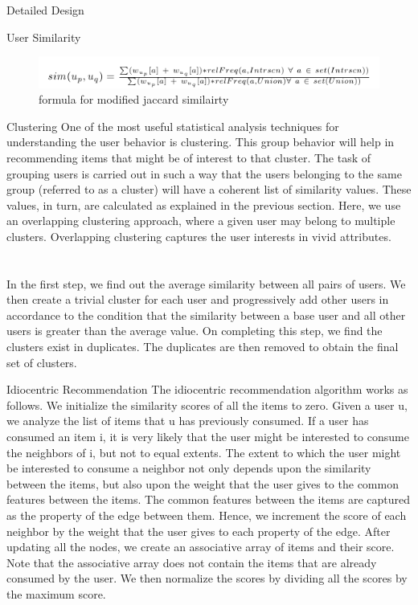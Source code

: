 \documentclass{report}
\begin{document}
\begin{projChapter}{Detailed Design}
\begin{projSection}{User Similarity}
\begin{figure}[ht!]
\centering
\includegraphics[scale=0.6]{images/similarity.png}
\caption{formula for modified jaccard similairty}
\label{similarity}
\end{figure}

\end{projSection}
\begin{projSection}{Clustering}
            One of the most useful statistical analysis techniques for understanding the user behavior is clustering. This group behavior will help in recommending items that might be of interest to that cluster. The task of grouping users is carried out in such a way that the users belonging to the same group (referred to as a cluster) will have a coherent list of similarity values. These values, in turn, are calculated as explained in the previous section. Here, we use an overlapping clustering approach, where a given user may belong to multiple clusters. Overlapping clustering captures the user interests in vivid attributes.
            ~\\\\
            ~\\
            In the first step, we find out the average similarity between all pairs of users. We then create a trivial cluster for each user and progressively add other users in accordance to the condition that the similarity between a base user and all other users is greater than the average value. On completing this step, we find the clusters exist in duplicates. The duplicates are then removed to obtain the final set of clusters.
        \end{projSection}
\begin{projSection}{Idiocentric Recommendation}
            The idiocentric recommendation algorithm works as follows. We initialize the similarity scores of all the items to zero. Given a user u, we analyze the list of items that u has previously consumed. If a user has consumed an item i, it is very likely that the user might be interested to consume the neighbors of i, but not to equal extents. The extent to which the user might be interested to consume a neighbor not only depends upon the similarity between the items, but also upon the weight that the user gives to the common features between the items. The common features between the items are captured as the property of the edge between them. Hence, we increment the score of each neighbor by the weight that the user gives to each property of the edge. After updating all the nodes, we create an associative array of items and their score. Note that the associative array does not contain the items that are already consumed by the user. We then normalize the scores by dividing all the scores by the maximum score.

\end{projSection}
\end{projChapter}
\end{document}
